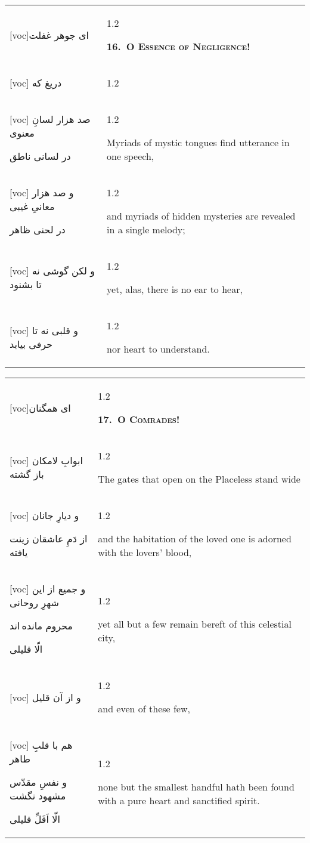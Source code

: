 \documentclass[11pt]{article}
\makeatletter
\newenvironment{orig}
  {\begin{farsi}[voc]}
  {\end{farsi}}
\newenvironment{trans}
  {\Large\begin{spacing}{1.2}\raggedright}
  {\end{spacing}}
\newenvironment{word}
  {\begin{tabular}[t]{p{2.75in}@{\hspace{3em}}p{2.875in}}}
  {\end{tabular}}
\newcommand{\ayat}[2]{\begin{orig}#1\end{orig} & \begin{trans}#2\end{trans}}
\newcommand{\heading}[2]{\textsc{\textbf{#1}} %
}
\makeatother
\begin{document}
\begin{word}
\ayat{ای جوهر غفلت}{\heading{16.~O Essence of Negligence!}{}} \\ \ayat{
دريغ که
}{} \vspace{-1ex}\\ \ayat{
صد هزار لسانِ معنوی

در لسانی ناطق
}{Myriads of mystic tongues find utterance in one speech,} \\ \ayat{
و صد هزار معانیِ غيبی

در لحنی ظاهر
}{and myriads of hidden mysteries are revealed in a single melody;} \\ \ayat{
و لکن گوشی نه تا بشنود
}{yet, alas, there is no ear to hear,} \vspace{-1ex}\\ \ayat{
و قلبی نه تا حرفی بيابد
}{nor heart to understand.}
\end{word}

\pagebreak

\begin{word}
\ayat{ای همگنان}{\heading{17.~O Comrades!}{}} \\ \ayat{
ابوابِ لامکان باز گشته
}{The gates that open on the Placeless stand wide} \vspace{-1ex}\\ \ayat{
و ديارِ جانان

از دَمِ عاشقان زينت يافته
}{and the habitation of the loved one is adorned with the lovers'
  blood,} \\ \ayat{
و جميع از اين شهرِ روحانی

محروم مانده اند

الّا قليلی
}{yet all but a few remain bereft of this celestial city,} \\ \ayat{
و از آن قليل
}{and even of these few,} \vspace{-1ex}\\ \ayat{
هم با قلبِ طاهر

و نفسِ مقدّس مشهود نگشت

الّا اَقَلِّ قليلی
}{none but the smallest handful hath been found with a pure heart and
  sanctified spirit.}
\end{word}

\pagebreak
\end{document}
